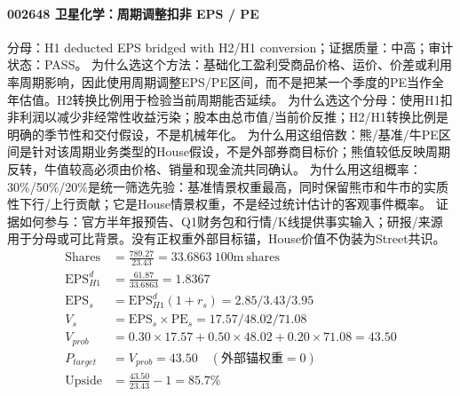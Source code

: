\paragraph{002648 卫星化学：周期调整扣非 EPS / PE}
分母：H1 deducted EPS bridged with H2/H1 conversion；证据质量：中高；审计状态：PASS。
为什么选这个方法：基础化工盈利受商品价格、运价、价差或利用率周期影响，因此使用周期调整EPS/PE区间，而不是把某一个季度的PE当作全年估值。H2转换比例用于检验当前周期能否延续。
为什么选这个分母：使用H1扣非利润以减少非经常性收益污染；股本由总市值/当前价反推；H2/H1转换比例是明确的季节性和交付假设，不是机械年化。
为什么用这组倍数：熊/基准/牛PE区间是针对该周期业务类型的House假设，不是外部券商目标价；熊值较低反映周期反转，牛值较高必须由价格、销量和现金流共同确认。
为什么用这组概率：30\%/50\%/20\%是统一筛选先验：基准情景权重最高，同时保留熊市和牛市的实质性下行/上行贡献；它是House情景权重，不是经过统计估计的客观事件概率。
证据如何参与：官方半年报预告、Q1财务包和行情/K线提供事实输入；研报/来源用于分母或可比背景。没有正权重外部目标锚，House价值不伪装为Street共识。
\begin{align*}
\mathrm{Shares} &= \frac{789.27}{23.43}=33.6863\ \mathrm{100m\ shares}\\
\mathrm{EPS}_{H1}^d &= \frac{61.87}{33.6863}=1.8367\\
\mathrm{EPS}_s &= \mathrm{EPS}_{H1}^d(1+r_s)=2.85/3.43/3.95\\
V_s &= \mathrm{EPS}_s\times \mathrm{PE}_s=17.57/48.02/71.08\\
V_{prob} &= 0.30\times 17.57+0.50\times 48.02+0.20\times 71.08=43.50\\
P_{target} &= V_{prob}=43.50\quad(\text{外部锚权重}=0)\\
\mathrm{Upside} &= \frac{43.50}{23.43}-1=85.7\%\\
\end{align*}

